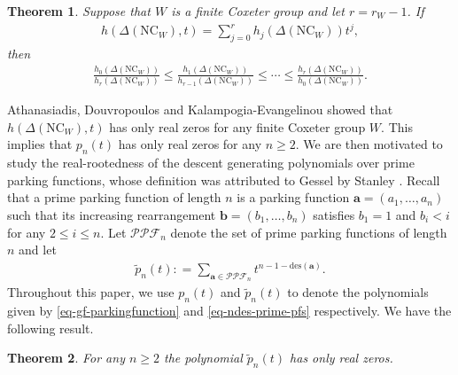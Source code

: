\documentclass[12pt]{article}
\newtheorem{thm}{Theorem}[section]
\newcommand{\PPF}{\mathcal{PPF}}
\newcommand{\PP}{p}
\newcommand{\PPP}{\tilde{p}}
\newcommand{\NC}{\mathrm{NC}}
\numberwithin{equation}{section}
\begin{document}
\begin{thm} \label{que:ADKE_5.5(b)}
\label{Athanasiadis-Douvropoulos-Kalampogia-Evangelinou-question}
Suppose that $W$ is a finite Coxeter group and let $r=r_W-1$. If
\begin{align*}
h(\Delta(\NC_W),t)=\sum_{j=0}^{r}h_j(\Delta(\NC_W))t^j,
\end{align*}
then 
    \begin{align}\label{que}
        \frac{h_0(\Delta(\NC_W))}{h_r(\Delta(\NC_W))}\le\frac{h_1(\Delta(\NC_W))}{h_{r-1}(\Delta(\NC_W))}\le\cdots\le \frac{h_r(\Delta(\NC_W))}{h_0(\Delta(\NC_W))}.
    \end{align}
\end{thm}

Athanasiadis, Douvropoulos and Kalampogia-Evangelinou \cite[Theorem 3 (a)]{Athanasiadis-Douvropoulos-Kalampogia-Evangelinou-2024} showed that $h(\Delta(\NC_W),t)$ has only real zeros for any finite Coxeter group $W$. This implies that $\PP_n(t)$ has only real zeros for any $n\geq 2$. We are then motivated to study the real-rootedness of the descent generating polynomials over prime parking functions, whose definition was attributed to Gessel by Stanley \cite[Exercise 5.49 (f)]{Stanley-2023}. 
Recall that a prime parking function  of length $n$ is a parking function $\mathbf{a}=(a_1,\ldots,a_n)$ such that its increasing rearrangement $\mathbf{b}=(b_1,\ldots,b_n)$ satisfies $b_1=1$ and $b_i<i$ for any $2\leq i\leq n$.
Let $\PPF_n$ denote the set of prime parking functions of length $n$ and let 
\begin{align}\label{eq-ndes-prime-pfs} 
\PPP_n(t):
=\sum_{\mathbf{a}\in \PPF_n}t^{n-1-\mathrm{des}(\mathbf{a})}.
\end{align}
Throughout this paper, we use $\PP_n(t)$ and $\PPP_n(t)$ to denote the polynomials given by \eqref{eq-gf-parkingfunction} and \eqref{eq-ndes-prime-pfs}
respectively. We have the following result. 

\begin{thm} \label{PPF-RZ}
For any $n\geq 2$ the polynomial $\PPP_n(t)$ has only real zeros.
\end{thm}
\end{document}
